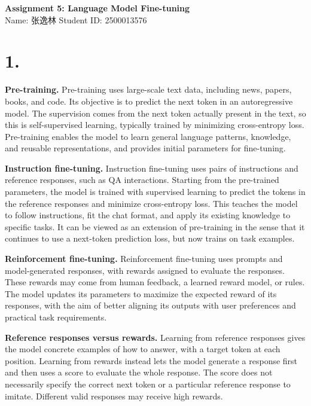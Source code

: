 \documentclass[11pt,a4paper]{article}
\begin{document}
\setlength{\abovedisplayskip}{7pt}
\setlength{\belowdisplayskip}{7pt}
\setlength{\abovedisplayshortskip}{4pt}
\setlength{\belowdisplayshortskip}{5pt}

\begin{center}
  {\Large\bfseries Assignment 5: Language Model Fine-tuning}\\[8pt]
  Name: 张逸林
  \hspace{8mm}
  Student ID: 2500013576
\end{center}

\section*{1.}

\textbf{Pre-training.}
Pre-training uses large-scale text data, including news, papers, books, and code.
Its objective is to predict the next token in an autoregressive model.
The supervision comes from the next token actually present in the text, so this
is self-supervised learning, typically trained by minimizing cross-entropy loss.
Pre-training enables the model to learn general language patterns, knowledge,
and reusable representations, and provides initial parameters for fine-tuning.

\textbf{Instruction fine-tuning.}
Instruction fine-tuning uses pairs of instructions and reference responses, such as QA
interactions. Starting from the pre-trained parameters, the model is trained
with supervised learning to predict the tokens in the reference responses and
minimize cross-entropy loss. This teaches the model to follow instructions,
fit the chat format, and apply its existing knowledge to specific tasks.
It can be viewed as an extension of pre-training in the sense that it continues
to use a next-token prediction loss, but now trains on task examples.

\textbf{Reinforcement fine-tuning.}
Reinforcement fine-tuning uses prompts and model-generated responses, with
rewards assigned to evaluate the responses. These rewards may come from human
feedback, a learned reward model, or rules. The model updates its parameters
to maximize the expected reward of its responses, with the aim of better aligning
its outputs with user preferences and practical task requirements.

\textbf{Reference responses versus rewards.}
Learning from reference responses gives the model concrete examples of how to
answer, with a target token at each position. Learning from rewards instead
lets the model generate a response first and then uses a score to evaluate
the whole response. The score does not necessarily specify the correct next
token or a particular reference response to imitate. Different valid responses
may receive high rewards.
\end{document}
